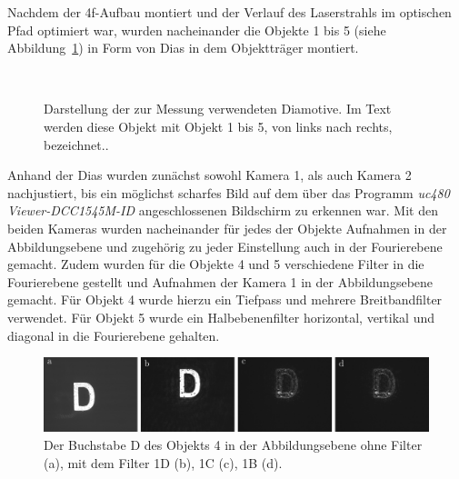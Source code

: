 \clearpage


Nachdem der 4f-Aufbau montiert und der Verlauf des Laserstrahls im optischen Pfad optimiert war, wurden nacheinander die Objekte 1 bis 5 (siehe Abbildung~\ref{fig:Objekte-aus-Anleitungsheft}) in Form von Dias in dem Objektträger montiert.

\begin{figure}[h]
	\centering
	~~
	~~
	~~
	~~
	\caption[Die zur Messung verwendeten Diamotive]{
		Darstellung der zur Messung verwendeten Diamotive. Im Text werden diese Objekt mit Objekt 1 bis 5, von links nach rechts, bezeichnet..
	}
	\label{fig:Objekte-aus-Anleitungsheft}
\end{figure}

Anhand der Dias wurden zunächst sowohl Kamera 1, als auch Kamera 2 nachjustiert, bis ein möglichst scharfes Bild auf dem über das Programm \textit{uc480 Viewer-DCC1545M-ID} angeschlossenen Bildschirm zu erkennen war. Mit den beiden Kameras wurden nacheinander für jedes der Objekte Aufnahmen in der Abbildungsebene und zugehörig zu jeder Einstellung auch in der Fourierebene gemacht. 
Zudem wurden für die Objekte 4 und 5 verschiedene Filter in die Fourierebene gestellt und Aufnahmen der Kamera 1 in der Abbildungsebene gemacht. Für Objekt 4 wurde hierzu ein Tiefpass und mehrere Breitbandfilter verwendet. Für Objekt 5 wurde ein Halbebenenfilter horizontal, vertikal und diagonal in die Fourierebene gehalten. \\


\begin{figure}[h]
	\centering
	\includegraphics{images/ergebniss_D/abb.pdf}
	\caption{
		Der Buchstabe D des Objekts 4 in der Abbildungsebene ohne Filter (a), mit dem Filter 1D (b), 1C (c), 1B (d).
	}
	\label{fig:example10_Filter1B}
\end{figure}

